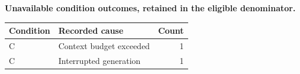 \begin{center}
\textbf{Unavailable condition outcomes, retained in the eligible denominator.}\par\vspace{3pt}
\small
\begin{tabular}{llr}
\toprule
Condition & Recorded cause & Count \\
\midrule
C & Context budget exceeded & 1 \\
C & Interrupted generation & 1 \\
\bottomrule
\end{tabular}
\end{center}
